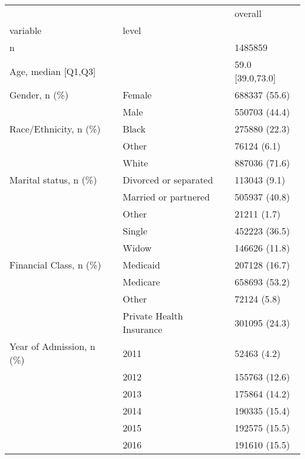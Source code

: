\begin{tabular}{lll}
\toprule
                                       &   &            overall \\
variable & level &                    \\
\midrule
n &   &            1485859 \\
Age, median [Q1,Q3] &   &   59.0 [39.0,73.0] \\
Gender, n (\%) & Female &      688337 (55.6) \\
                                       & Male &      550703 (44.4) \\
Race/Ethnicity, n (\%) & Black &      275880 (22.3) \\
                                       & Other &        76124 (6.1) \\
                                       & White &      887036 (71.6) \\
Marital status, n (\%) & Divorced or separated &       113043 (9.1) \\
                                       & Married or partnered &      505937 (40.8) \\
                                       & Other &        21211 (1.7) \\
                                       & Single &      452223 (36.5) \\
                                       & Widow &      146626 (11.8) \\
Financial Class, n (\%) & Medicaid &      207128 (16.7) \\
                                       & Medicare &      658693 (53.2) \\
                                       & Other &        72124 (5.8) \\
                                       & Private Health Insurance &      301095 (24.3) \\
Year of Admission, n (\%) & 2011 &        52463 (4.2) \\
                                       & 2012 &      155763 (12.6) \\
                                       & 2013 &      175864 (14.2) \\
                                       & 2014 &      190335 (15.4) \\
                                       & 2015 &      192575 (15.5) \\
                                       & 2016 &      191610 (15.5) \\

\end{tabular}
